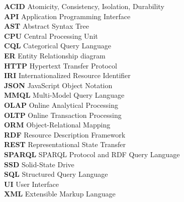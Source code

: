 
\textbf{ACID} Atomicity, Consistency, Isolation, Durability \\
\textbf{API} Application Programming Interface \\
\textbf{AST} Abstract Syntax Tree \\
\textbf{CPU} Central Processing Unit \\
\textbf{CQL} Categorical Query Language \\
\textbf{ER} Entity Relationship diagram \\
\textbf{HTTP} Hypertext Transfer Protocol \\
\textbf{IRI} Internationalized Resource Identifier \\
\textbf{JSON} JavaScript Object Notation \\
\textbf{MMQL} Multi-Model Query Language \\
\textbf{OLAP} Online Analytical Processing \\
\textbf{OLTP} Online Transaction Processing \\
\textbf{ORM} Object-Relational Mapping \\
\textbf{RDF} Resource Description Framework \\
\textbf{REST} Representational State Transfer \\
\textbf{SPARQL} SPARQL Protocol and RDF Query Language \\
\textbf{SSD} Solid-State Drive \\
\textbf{SQL} Structured Query Language \\
\textbf{UI} User Interface \\
\textbf{XML} Extensible Markup Language